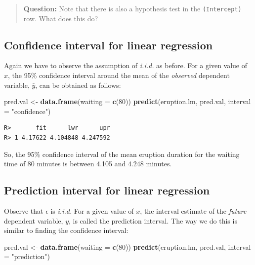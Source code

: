 \documentclass[english,10pt,a4paper,oneside]{book}
\newenvironment{Shaded}{\begin{snugshade}}{\end{snugshade}}
\newcommand{\DataTypeTok}[1]{\textcolor[rgb]{0.13,0.29,0.53}{#1}}
\newcommand{\DecValTok}[1]{\textcolor[rgb]{0.00,0.00,0.81}{#1}}
\newcommand{\KeywordTok}[1]{\textcolor[rgb]{0.13,0.29,0.53}{\textbf{#1}}}
\newcommand{\NormalTok}[1]{#1}
\newcommand{\StringTok}[1]{\textcolor[rgb]{0.31,0.60,0.02}{#1}}
\theoremstyle{definition}
\theoremstyle{definition}
\theoremstyle{definition}
\theoremstyle{remark}
\begin{document}
\begin{quote}
\textbf{Question:} Note that there is also a hypothesis test in the
\texttt{(Intercept)} row. What does this do?
\end{quote}

\hypertarget{confidence-interval-for-linear-regression}{%
\subsection{Confidence interval for linear
regression}\label{confidence-interval-for-linear-regression}}

Again we have to observe the assumption of \emph{i.i.d.} as before. For
a given value of \(x\), the 95\% confidence interval around the mean of
the \emph{observed} dependent variable, \(\bar{y}\), can be obtained as
follows:

\begin{Shaded}
\begin{Highlighting}[]
\NormalTok{pred.val <-}\StringTok{ }\KeywordTok{data.frame}\NormalTok{(}\DataTypeTok{waiting =} \KeywordTok{c}\NormalTok{(}\DecValTok{80}\NormalTok{))}
\KeywordTok{predict}\NormalTok{(eruption.lm, pred.val, }\DataTypeTok{interval =} \StringTok{"confidence"}\NormalTok{)}
\end{Highlighting}
\end{Shaded}

\begin{verbatim}
R>       fit      lwr      upr
R> 1 4.17622 4.104848 4.247592
\end{verbatim}

So, the 95\% confidence interval of the mean eruption duration for the
waiting time of 80 minutes is between 4.105 and 4.248 minutes.

\hypertarget{prediction-interval-for-linear-regression}{%
\subsection{Prediction interval for linear
regression}\label{prediction-interval-for-linear-regression}}

Observe that \(\epsilon\) is \emph{i.i.d.} For a given value of \(x\),
the interval estimate of the \emph{future} dependent variable, \(y\), is
called the prediction interval. The way we do this is similar to finding
the confidence interval:

\begin{Shaded}
\begin{Highlighting}[]
\NormalTok{pred.val <-}\StringTok{ }\KeywordTok{data.frame}\NormalTok{(}\DataTypeTok{waiting =} \KeywordTok{c}\NormalTok{(}\DecValTok{80}\NormalTok{))}
\KeywordTok{predict}\NormalTok{(eruption.lm, pred.val, }\DataTypeTok{interval =} \StringTok{"prediction"}\NormalTok{)}
\end{Highlighting}
\end{Shaded}
\end{document}
